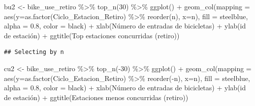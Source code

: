 \documentclass[
]{article}
\newenvironment{Shaded}{\begin{snugshade}}{\end{snugshade}}
\newcommand{\AttributeTok}[1]{\textcolor[rgb]{0.77,0.63,0.00}{#1}}
\newcommand{\DecValTok}[1]{\textcolor[rgb]{0.00,0.00,0.81}{#1}}
\newcommand{\FloatTok}[1]{\textcolor[rgb]{0.00,0.00,0.81}{#1}}
\newcommand{\FunctionTok}[1]{\textcolor[rgb]{0.00,0.00,0.00}{#1}}
\newcommand{\NormalTok}[1]{#1}
\newcommand{\OtherTok}[1]{\textcolor[rgb]{0.56,0.35,0.01}{#1}}
\newcommand{\SpecialCharTok}[1]{\textcolor[rgb]{0.00,0.00,0.00}{#1}}
\newcommand{\StringTok}[1]{\textcolor[rgb]{0.31,0.60,0.02}{#1}}
\begin{document}
\begin{Shaded}
\begin{Highlighting}[]
\NormalTok{bu2 }\OtherTok{\textless{}{-}}\NormalTok{ bike\_use\_retiro }\SpecialCharTok{\%\textgreater{}\%} 
    \FunctionTok{top\_n}\NormalTok{(}\DecValTok{30}\NormalTok{) }\SpecialCharTok{\%\textgreater{}\%} 
    \FunctionTok{ggplot}\NormalTok{() }\SpecialCharTok{+}
    \FunctionTok{geom\_col}\NormalTok{(}\AttributeTok{mapping =} \FunctionTok{aes}\NormalTok{(}\AttributeTok{y=}\FunctionTok{as.factor}\NormalTok{(Ciclo\_Estacion\_Retiro) }\SpecialCharTok{\%\textgreater{}\%} 
                               \FunctionTok{reorder}\NormalTok{(n),}
                           \AttributeTok{x=}\NormalTok{n),}
             \AttributeTok{fill =} \StringTok{\textquotesingle{}steelblue\textquotesingle{}}\NormalTok{,}
             \AttributeTok{alpha =} \FloatTok{0.8}\NormalTok{,}
             \AttributeTok{color =} \StringTok{\textquotesingle{}black\textquotesingle{}}\NormalTok{) }\SpecialCharTok{+}
    \FunctionTok{xlab}\NormalTok{(}\StringTok{\textquotesingle{}Número de entradas de bicicletas\textquotesingle{}}\NormalTok{) }\SpecialCharTok{+}
    \FunctionTok{ylab}\NormalTok{(}\StringTok{\textquotesingle{}id de estación\textquotesingle{}}\NormalTok{) }\SpecialCharTok{+} 
    \FunctionTok{ggtitle}\NormalTok{(}\StringTok{\textquotesingle{}Top estaciones concurridas (retiro)\textquotesingle{}}\NormalTok{)}
\end{Highlighting}
\end{Shaded}

\begin{verbatim}
## Selecting by n
\end{verbatim}

\begin{Shaded}
\begin{Highlighting}[]
\NormalTok{cu2 }\OtherTok{\textless{}{-}}\NormalTok{ bike\_use\_retiro }\SpecialCharTok{\%\textgreater{}\%} 
    \FunctionTok{top\_n}\NormalTok{(}\SpecialCharTok{{-}}\DecValTok{30}\NormalTok{) }\SpecialCharTok{\%\textgreater{}\%} 
    \FunctionTok{ggplot}\NormalTok{() }\SpecialCharTok{+}
    \FunctionTok{geom\_col}\NormalTok{(}\AttributeTok{mapping =} \FunctionTok{aes}\NormalTok{(}\AttributeTok{y=}\FunctionTok{as.factor}\NormalTok{(Ciclo\_Estacion\_Retiro) }\SpecialCharTok{\%\textgreater{}\%} 
                               \FunctionTok{reorder}\NormalTok{(}\SpecialCharTok{{-}}\NormalTok{n),}
                           \AttributeTok{x=}\NormalTok{n),}
             \AttributeTok{fill =} \StringTok{\textquotesingle{}steelblue\textquotesingle{}}\NormalTok{,}
             \AttributeTok{alpha =} \FloatTok{0.8}\NormalTok{,}
             \AttributeTok{color =} \StringTok{\textquotesingle{}black\textquotesingle{}}\NormalTok{) }\SpecialCharTok{+}
    \FunctionTok{xlab}\NormalTok{(}\StringTok{\textquotesingle{}Número de entradas de bicicletas\textquotesingle{}}\NormalTok{) }\SpecialCharTok{+}
    \FunctionTok{ylab}\NormalTok{(}\StringTok{\textquotesingle{}id de estación\textquotesingle{}}\NormalTok{) }\SpecialCharTok{+}
    \FunctionTok{ggtitle}\NormalTok{(}\StringTok{\textquotesingle{}Estaciones menos concurridas (retiro)\textquotesingle{}}\NormalTok{)}
\end{Highlighting}
\end{Shaded}
\end{document}
